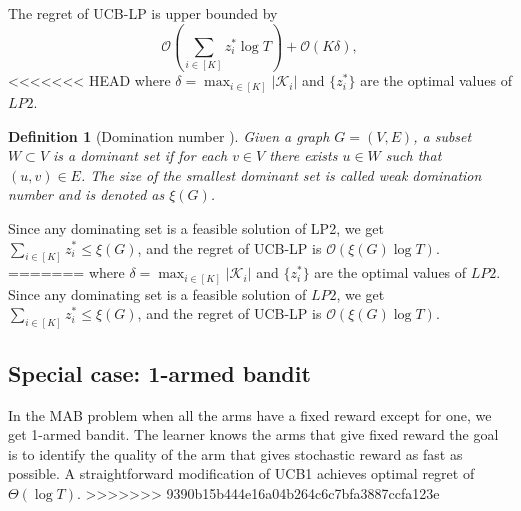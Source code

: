 \documentclass{article}
\newtheorem{definition}{Definition}
\begin{document}
The regret of UCB-LP is upper bounded by 
\begin{equation}
\label{eqn:UCBLPUpperBound}
\mathcal{O}\left(\sum_{i\in [K]} z_i^* \log T\right) +\mathcal{O}(K\delta),
\end{equation}
<<<<<<< HEAD
where $\delta= \max_{i \in [K]}|\mathcal{K}_i|$ and $\{z_i^*\}$ are the optimal values of $LP2$. 
\begin{definition}[Domination number \cite{Sigmetrics15_StochasticBanditsWithSideObservations_BuccapatnamEriyilmazShroff}]
	Given a graph $G=(V,E)$, a subset $W\subset V$ is a dominant set if for each $v\in V$ there exists $u \in W$ such that $(u,v)\in E$. The size of the smallest dominant set is called weak domination number and is denoted as $\xi(G)$. 
\end{definition} 	
Since any dominating set is a feasible solution of LP2, we get $\sum_{i\in [K]}z_i^*\leq \xi(G)$, and the regret of UCB-LP is $\mathcal{O}(\xi(G)\log T)$. 
=======
where $\delta= \max_{i \in [K]}|\mathcal{K}_i|$ and $\{z_i^*\}$ are the optimal values of $LP2$. Since any dominating set is a feasible solution of $LP2$, we get $\sum_{i\in [K]}z_i^*\leq \xi(G)$, and the regret of UCB-LP is $\mathcal{O}(\xi(G)\log T)$. 
\subsection{Special case: 1-armed bandit}
In the MAB problem when all the arms have a fixed reward except for one, we get 1-armed bandit. 
The learner knows the arms that give fixed reward the goal is to identify the quality of the arm that gives stochastic reward as fast as possible. A straightforward modification of UCB1 achieves optimal regret of $\Theta(\log T)$.
>>>>>>> 9390b15b444e16a04b264c6c7bfa3887ccfa123e
  
\end{document}
